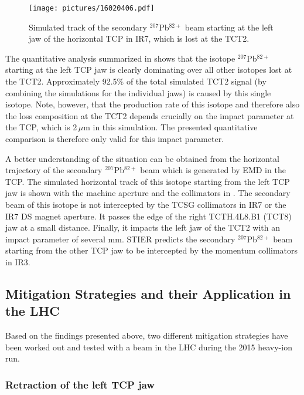 \begin{figure}[b]  
    \centering
    \texttt{[image: pictures/16020406.pdf]}
    \caption{Simulated track of the secondary $^{207}$Pb$^{82+}$ beam starting at the left jaw of the horizontal TCP in IR7, which is lost at the TCT2. }  
    \label{pic:16020405}
\end{figure}



The quantitative analysis summarized in  shows that the isotope $^{207}$Pb$^{82+}$ starting at the left TCP jaw is clearly dominating over all other isotopes lost at the TCT2. Approximately 92.5\% of the total simulated TCT2 signal (by combining the simulations for the individual jaws) is caused by this single isotope. Note, however,  that the production rate of this isotope and therefore also the loss composition at the TCT2 depends crucially on the impact parameter at the TCP, which is 2\,$\mu$m in this simulation. The presented quantitative comparison is therefore only valid for this impact parameter.

\newpage

A better understanding of the situation can be obtained from the horizontal trajectory of the secondary $^{207}$Pb$^{82+}$ beam which is generated by EMD in the TCP. The simulated horizontal track of this isotope starting from the left TCP jaw is shown with the machine aperture and the collimators in . The secondary beam of this isotope is not intercepted by the TCSG collimators in IR7 or the IR7 DS magnet aperture. It passes the edge of the right TCTH.4L8.B1 (TCT8) jaw at a small distance. Finally, it impacts the left jaw of the TCT2 with an impact parameter of several mm. STIER predicts the secondary  $^{207}$Pb$^{82+}$ beam starting from the other TCP jaw to be intercepted by the momentum collimators in IR3. 


\subsection{Mitigation Strategies and their Application in the LHC}

Based on the findings presented above, two different mitigation strategies have been worked out and tested with a \lead beam in the LHC during the 2015 heavy-ion run.

\subsubsection{Retraction of the left TCP jaw}


